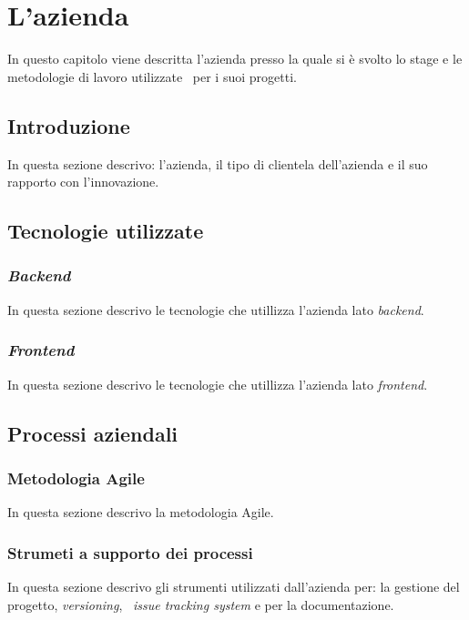 
\chapter{L'azienda}
\label{cap:azienda}
In questo capitolo viene descritta l’azienda presso la quale si è svolto lo stage e le metodologie di lavoro utilizzate \
per i suoi progetti.

\section{Introduzione}
In questa sezione descrivo: l'azienda, il tipo di clientela dell'azienda e il suo rapporto con l'innovazione.

\section{Tecnologie utilizzate}

\subsection{\emph{Backend}}
In questa sezione descrivo le tecnologie che utillizza l'azienda lato \emph{backend}.

\subsection{\emph{Frontend}}
In questa sezione descrivo le tecnologie che utillizza l'azienda lato \emph{frontend}.

\section{Processi aziendali}

\subsection{Metodologia Agile}
In questa sezione descrivo la metodologia Agile.

\subsection{Strumeti a supporto dei processi}
In questa sezione descrivo gli strumenti utilizzati dall'azienda per: la gestione del progetto, \emph{versioning}, \
\emph{issue tracking system} e per la documentazione.
